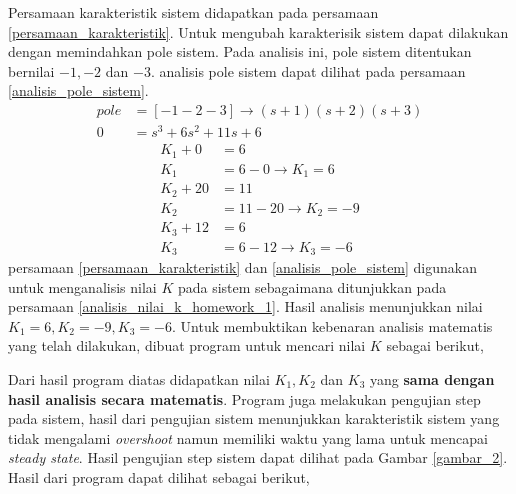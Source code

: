 \documentclass[../main.tex]{subfiles}
\begin{document}
            Persamaan karakteristik sistem didapatkan pada persamaan \eqref{persamaan_karakteristik}. Untuk mengubah karakterisik sistem dapat dilakukan dengan memindahkan pole sistem. Pada analisis ini, pole sistem ditentukan bernilai $-1,-2$ dan $-3$. analisis pole sistem dapat dilihat pada persamaan \eqref{analisis_pole_sistem}. 
            \begin{equation}
                \begin{split}
                    pole &= [-1 -2 -3] \rightarrow (s+1)(s+2)(s+3) \\[5pt]
                    0 &= s^3 + 6s^2 + 11s + 6
                    \label{analisis_pole_sistem}
                \end{split}
            \end{equation}
            \begin{equation}
                \begin{split}
                    K_1 + 0 &= 6 \\[5pt] 
                    K_1 &= 6 - 0 \rightarrow K_1 = 6 \\[10pt]
                    K_2 + 20 &= 11 \\[5pt] 
                    K_2 &= 11 - 20 \rightarrow K_2 = -9 \\[10pt]
                    K_3 + 12 &= 6 \\[5pt] 
                    K_3 &= 6 - 12 \rightarrow K_3 = -6
                    \label{analisis_nilai_k_homework_1}
                \end{split}
            \end{equation}
            persamaan \eqref{persamaan_karakteristik} dan \eqref{analisis_pole_sistem} digunakan untuk menganalisis nilai $K$ pada sistem sebagaimana ditunjukkan pada persamaan \eqref{analisis_nilai_k_homework_1}. Hasil analisis menunjukkan nilai $K_1 = 6, K_2 = -9, K_3 = -6$. Untuk membuktikan kebenaran analisis matematis yang telah dilakukan, dibuat program untuk mencari nilai $K$ sebagai berikut,
            
            Dari hasil program diatas didapatkan nilai $K_1, K_2$ dan $K_3$ yang \textbf{sama dengan hasil analisis secara matematis}. Program juga melakukan pengujian step pada sistem, hasil dari pengujian sistem menunjukkan karakteristik sistem yang tidak mengalami \textit{overshoot} namun memiliki waktu yang lama untuk mencapai \textit{steady state}. Hasil pengujian step sistem dapat dilihat pada Gambar \ref{gambar_2}. Hasil dari program dapat dilihat sebagai berikut,
\end{document}
